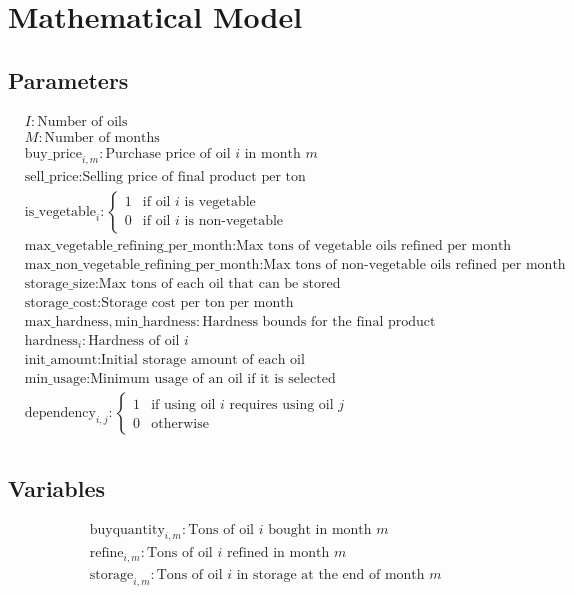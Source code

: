 \documentclass{article}
\begin{document}
\section*{Mathematical Model}

\subsection*{Parameters}
\begin{align*}
& I: \text{Number of oils} \\
& M: \text{Number of months} \\
& \text{buy\_price}_{i,m}: \text{Purchase price of oil } i \text{ in month } m \\
& \text{sell\_price}: \text{Selling price of final product per ton} \\
& \text{is\_vegetable}_{i}: 
    \begin{cases}
      1 & \text{if oil } i \text{ is vegetable} \\
      0 & \text{if oil } i \text{ is non-vegetable}
    \end{cases} \\
& \text{max\_vegetable\_refining\_per\_month}: \text{Max tons of vegetable oils refined per month} \\
& \text{max\_non\_vegetable\_refining\_per\_month}: \text{Max tons of non-vegetable oils refined per month} \\
& \text{storage\_size}: \text{Max tons of each oil that can be stored} \\
& \text{storage\_cost}: \text{Storage cost per ton per month} \\
& \text{max\_hardness}, \text{min\_hardness}: \text{Hardness bounds for the final product} \\
& \text{hardness}_{i}: \text{Hardness of oil } i \\
& \text{init\_amount}: \text{Initial storage amount of each oil} \\
& \text{min\_usage}: \text{Minimum usage of an oil if it is selected} \\
& \text{dependency}_{i,j}: 
    \begin{cases}
      1 & \text{if using oil } i \text{ requires using oil } j \\
      0 & \text{otherwise}
    \end{cases} \\
\end{align*}

\subsection*{Variables}
\begin{align*}
& \text{buyquantity}_{i,m}: \text{Tons of oil } i \text{ bought in month } m \\
& \text{refine}_{i,m}: \text{Tons of oil } i \text{ refined in month } m \\
& \text{storage}_{i,m}: \text{Tons of oil } i \text{ in storage at the end of month } m \\
\end{align*}
\end{document}
